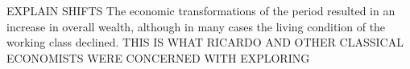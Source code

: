  EXPLAIN SHIFTS  The economic transformations of the period resulted in an increase in overall wealth, although in many cases the living condition of the working class declined. THIS IS WHAT RICARDO AND OTHER CLASSICAL ECONOMISTS WERE CONCERNED WITH EXPLORING

 



